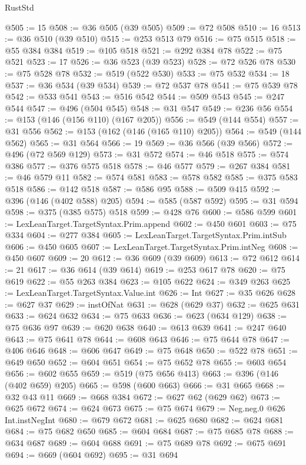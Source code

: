 \begin{lexlean}{RustStd}
\begin{coremodule}
@505 := 15
@508 := @36 @505 (@39 @505)
@509 := @72 @508
@510 := 16
@513 := @36 @510 (@39 @510)
@515 := @253 @513 @79
@516 := @75 @515
@518 := @55 @384 @384
@519 := @105 @518
@521 := @292 @384 @78
@522 := @75 @521
@523 := 17
@526 := @36 @523 (@39 @523)
@528 := @72 @526 @78
@530 := @75 @528 @78
@532 := @519 (@522 @530)
@533 := @75 @532
@534 := 18
@537 := @36 @534 (@39 @534)
@539 := @72 @537 @78
@541 := @75 @539 @78
@542 := @533 @541
@543 := @516 @542
@544 := @509 @543
@545 := @247 @544
@547 := @496 (@504 @545)
@548 := @31 @547
@549 := @236 @56
@554 := @153 (@146 (@156 @110) (@167 @205))
@556 := @549 (@144 @554)
@557 := @31 @556
@562 := @153 (@162 (@146 (@165 @110) @205))
@564 := @549 (@144 @562)
@565 := @31 @564
@566 := 19
@569 := @36 @566 (@39 @566)
@572 := @496 (@72 @569 @129)
@573 := @31 @572
@574 := @46 @518
@575 := @574 @386
@577 := @376 @575 @518
@578 := @46 @577
@579 := @267 @384
@581 := @46 @579 @11
@582 := @574 @581
@583 := @578 @582
@585 := @375 @583 @518
@586 := @142 @518
@587 := @586 @95
@588 := @509 @415
@592 := @396 (@146 (@402 @588) @205)
@594 := @585 (@587 @592)
@595 := @31 @594
@598 := @375 (@385 @575) @518
@599 := @428 @76
@600 := @586 @599
@601 := LexLeanTarget.TargetSyntax.Prim.append
@602 := @450 @601
@603 := @75 @334
@604 := @277 @384
@605 := LexLeanTarget.TargetSyntax.Prim.intSub
@606 := @450 @605
@607 := LexLeanTarget.TargetSyntax.Prim.intNeg
@608 := @450 @607
@609 := 20
@612 := @36 @609 (@39 @609)
@613 := @72 @612
@614 := 21
@617 := @36 @614 (@39 @614)
@619 := @253 @617 @78
@620 := @75 @619
@622 := @55 @263 @384
@623 := @105 @622
@624 := @349 @263
@625 := LexLeanTarget.TargetSyntax.Value.int
@626 := Int
@627 := @35 @626
@628 := @627 @37
@629 := instOfNat
@631 := @628 (@629 @37)
@632 := @625 @631
@633 := @624 @632
@634 := @75 @633
@636 := @623 (@634 @129)
@638 := @75 @636 @97
@639 := @620 @638
@640 := @613 @639
@641 := @247 @640
@643 := @75 @641 @78
@644 := @608 @643
@646 := @75 @644 @78
@647 := @406 @646
@648 := @606 @647
@649 := @75 @648
@650 := @522 @78
@651 := @649 @650
@652 := @604 @651
@654 := @75 @652 @78
@655 := @603 @654
@656 := @602 @655
@659 := @519 (@75 @656 @413)
@663 := @396 (@146 (@402 @659) @205)
@665 := @598 (@600 @663)
@666 := @31 @665
@668 := @32 @43 @11
@669 := @668 @384
@672 := @627 @62 (@629 @62)
@673 := @625 @672
@674 := @624 @673
@675 := @75 @674
@679 := Neg.neg.{0} @626 Int.instNegInt
@680 := @679 @672
@681 := @625 @680
@682 := @624 @681
@684 := @75 @682 @650
@685 := @604 @684
@687 := @75 @685 @78
@688 := @634 @687
@689 := @604 @688
@691 := @75 @689 @78
@692 := @675 @691
@694 := @669 (@604 @692)
@695 := @31 @694

\end{coremodule}
\end{lexlean}
